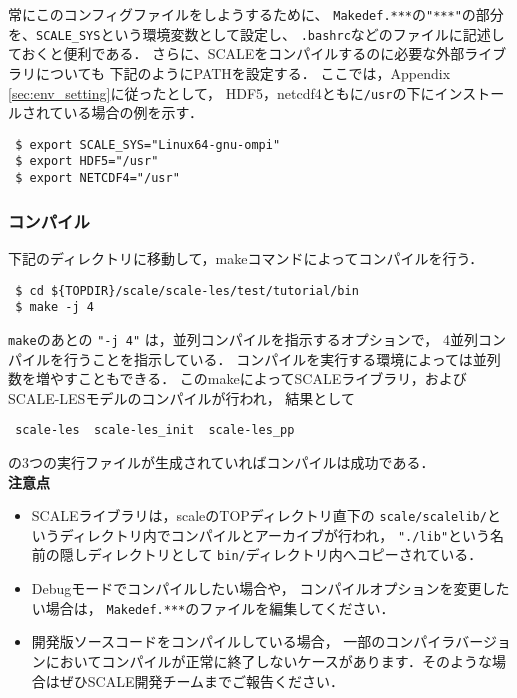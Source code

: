 常にこのコンフィグファイルをしようするために、
\verb|Makedef.***|の\verb|"***"|の部分を、\verb|SCALE_SYS|という環境変数として設定し、
\verb|.bashrc|などのファイルに記述しておくと便利である．
さらに、SCALEをコンパイルするのに必要な外部ライブラリについても
下記のようにPATHを設定する．
ここでは，Appendix \ref{sec:env_setting}に従ったとして，
HDF5，netcdf4ともに\verb|/usr|の下にインストールされている場合の例を示す．

\begin{verbatim}
 $ export SCALE_SYS="Linux64-gnu-ompi"
 $ export HDF5="/usr"
 $ export NETCDF4="/usr"
\end{verbatim}


\subsubsection{コンパイル}

下記のディレクトリに移動して，makeコマンドによってコンパイルを行う．
\begin{verbatim}
 $ cd ${TOPDIR}/scale/scale-les/test/tutorial/bin
 $ make -j 4
\end{verbatim}
\verb|make|のあとの \verb|"-j 4"| は，並列コンパイルを指示するオプションで，
4並列コンパイルを行うことを指示している．
コンパイルを実行する環境によっては並列数を増やすこともできる．
このmakeによってSCALEライブラリ，およびSCALE-LESモデルのコンパイルが行われ，
結果として
\begin{verbatim}
 scale-les  scale-les_init  scale-les_pp
\end{verbatim}
の3つの実行ファイルが生成されていればコンパイルは成功である．\\


{\bf 注意点}
\begin{itemize}
\item SCALEライブラリは，scaleのTOPディレクトリ直下の
 \verb|scale/scalelib/|というディレクトリ内でコンパイルとアーカイブが行われ，
 \verb|"./lib"|という名前の隠しディレクトリとして
 \verb|bin/|ディレクトリ内へコピーされている．
\item Debugモードでコンパイルしたい場合や，
 コンパイルオプションを変更したい場合は，
 \verb|Makedef.***|のファイルを編集してください．
\item 開発版ソースコードをコンパイルしている場合，
 一部のコンパイラバージョンにおいてコンパイルが正常に終了しないケースがあります．そのような場合はぜひSCALE開発チームまでご報告ください．
\end{itemize}



